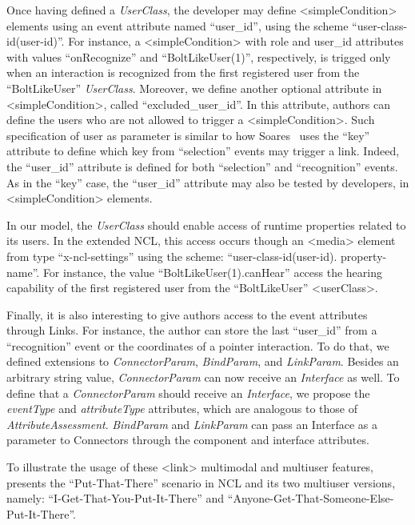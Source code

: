 Once having defined a \textit{UserClass}, the developer may define
<simpleCondition> elements using an event attribute named “user\_id”, using the
scheme “user-class-id(user-id)”. For instance, a <simpleCondition> with role and
user\_id attributes with values “onRecognize” and “BoltLikeUser(1)”,
respectively, is trigged only when an interaction is recognized from the first
registered user from the “BoltLikeUser” \textit{UserClass}. Moreover, we define
another optional attribute in <simpleCondition>, called “excluded\_user\_id”. In
this attribute, authors can define the users who are not allowed to trigger a
<simpleCondition>. Such specification of user as parameter is similar to how
Soares~\cite{soares_nested_2009} uses the “key” attribute to define which key
from “selection” events may trigger a link. Indeed, the “user\_id” attribute is
defined for both “selection” and “recognition” events. As in the “key” case, the
“user\_id” attribute may also be tested by developers, in <simpleCondition>
elements.

In our model, the \textit{UserClass} should enable access of runtime properties
related to its users. In the extended NCL, this access occurs though an <media>
element from type “x-ncl-settings” using the scheme: “user-class-id(user-id).
property-name”. For instance, the value “BoltLikeUser(1).canHear” access the
hearing capability of the first registered user from the “BoltLikeUser”
<userClass>.

Finally, it is also interesting to give authors access to the event attributes
through Links. For instance, the author can store the last “user\_id” from a
“recognition” event or the coordinates of a pointer interaction. To do that, we
defined extensions to \textit{ConnectorParam}, \textit{BindParam}, and
\textit{LinkParam}. Besides an arbitrary string value, \textit{ConnectorParam}
can now receive an
\textit{Interface} as well. To define that a \textit{ConnectorParam} should
receive an \textit{Interface}, we propose the
\textit{eventType} and \textit{attributeType} attributes, which are analogous to
those of
\textit{AttributeAssessment}. \textit{BindParam} and \textit{LinkParam} can pass
an Interface as a parameter to Connectors through the component and interface
attributes.

To illustrate the usage of these <link> multimodal and multiuser features,
 presents the “Put-That-There” scenario in NCL and its two multiuser versions, namely: “I-Get-That-You-Put-It-There” and
“Anyone-Get-That-Someone-Else-Put-It-There”.


